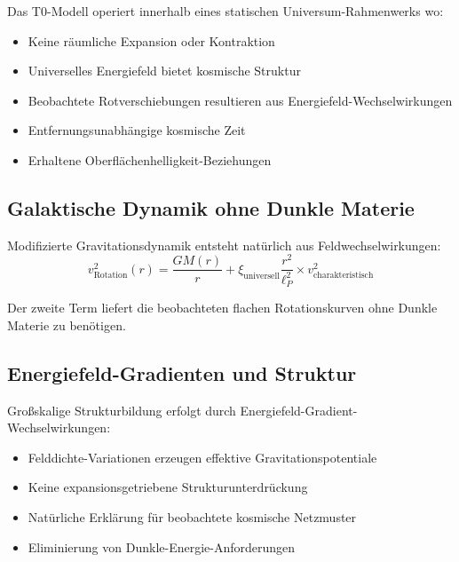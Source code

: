 \documentclass[12pt,a4paper]{article}
\begin{document}
	\begin{tcolorbox}[colback=blue!5!white,colframe=blue!75!black,title=Statisches Universum-Paradigma]
		Das T0-Modell operiert innerhalb eines statischen Universum-Rahmenwerks wo:
		\begin{itemize}
			\item Keine r\"aumliche Expansion oder Kontraktion
			\item Universelles Energiefeld bietet kosmische Struktur
			\item Beobachtete Rotverschiebungen resultieren aus Energiefeld-Wechselwirkungen
			\item Entfernungsunabh\"angige kosmische Zeit
			\item Erhaltene Oberfl\"achenhelligkeit-Beziehungen
		\end{itemize}
	\end{tcolorbox}
	
	\subsection{Galaktische Dynamik ohne Dunkle Materie}
	\label{subsec:galactic_dynamics}
	
	Modifizierte Gravitationsdynamik entsteht nat\"urlich aus Feldwechselwirkungen:
	\begin{equation}
		v_{\text{Rotation}}^2(r) = \frac{GM(r)}{r} + \xi_{\text{universell}} \frac{r^2}{\ell_P^2} \times v_{\text{charakteristisch}}^2
	\end{equation}
	
	Der zweite Term liefert die beobachteten flachen Rotationskurven ohne Dunkle Materie zu ben\"otigen.
	
	\subsection{Energiefeld-Gradienten und Struktur}
	\label{subsec:field_gradients}
	
	Gro{\ss}skalige Strukturbildung erfolgt durch Energiefeld-Gradient-Wechselwirkungen:
	\begin{itemize}
		\item Felddichte-Variationen erzeugen effektive Gravitationspotentiale
		\item Keine expansionsgetriebene Strukturunterdr\"uckung
		\item Nat\"urliche Erkl\"arung f\"ur beobachtete kosmische Netzmuster
		\item Eliminierung von Dunkle-Energie-Anforderungen
	\end{itemize}
	
\end{document}
